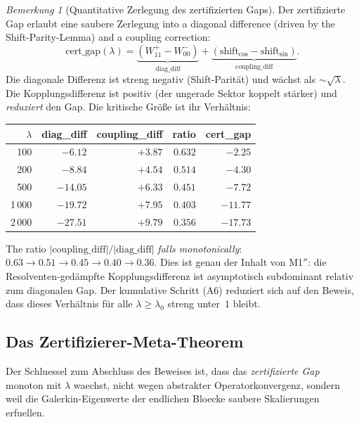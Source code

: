 \documentclass[12pt,a4paper]{article}
\theoremstyle{definition}
\theoremstyle{remark}
\newtheorem{remark}[theorem]{Bemerkung}
\begin{document}
\begin{remark}[Quantitative Zerlegung des zertifizierten Gaps]
\label{rem:gap-decomposition}
Der zertifizierte Gap erlaubt eine saubere Zerlegung into a diagonal difference (driven by the Shift-Parity-Lemma) and a coupling correction:
\[
  \mathrm{cert\_gap}(\lambda) = \underbrace{(W_{11}^+ - W_{00}^-)}_{\text{diag\_diff}} + \underbrace{(\text{shift}_{\cos} - \text{shift}_{\sin})}_{\text{coupling\_diff}}.
\]
Die diagonale Differenz ist streng negativ (Shift-Parität) und wächst als $\sim\!\sqrt{\lambda}$. Die Kopplungsdifferenz ist positiv (der ungerade Sektor koppelt stärker) und \emph{reduziert} den Gap. Die kritische Größe ist ihr Verhältnis:

\begin{center}
\small
\begin{tabular}{r|r|r|r|r}
$\lambda$ & diag\_diff & coupling\_diff & ratio & cert\_gap \\\hline
100 & $-6.12$ & $+3.87$ & $0.632$ & $-2.25$ \\
200 & $-8.84$ & $+4.54$ & $0.514$ & $-4.30$ \\
500 & $-14.05$ & $+6.33$ & $0.451$ & $-7.72$ \\
1\,000 & $-19.72$ & $+7.95$ & $0.403$ & $-11.77$ \\
2\,000 & $-27.51$ & $+9.79$ & $0.356$ & $-17.73$
\end{tabular}
\end{center}

\noindent The ratio $|\text{coupling\_diff}|/|\text{diag\_diff}|$ \emph{falls monotonically}: $0.63 \to 0.51 \to 0.45 \to 0.40 \to 0.36$. Dies ist genau der Inhalt von M1$''$: die Resolventen-gedämpfte Kopplungsdifferenz ist asymptotisch subdominant relativ zum diagonalen Gap. Der kumulative Schritt (A6) reduziert sich auf den Beweis, dass dieses Verhältnis für alle $\lambda \geq \lambda_0$ streng unter~$1$ bleibt.
\end{remark}

\subsection{Das Zertifizierer-Meta-Theorem}
\label{sec:meta-theorem}

Der Schluessel zum Abschluss des Beweises ist, dass das \emph{zertifizierte Gap} monoton mit $\lambda$ waechst, nicht wegen abstrakter Operatorkonvergenz, sondern weil die Galerkin-Eigenwerte der endlichen Bloecke saubere Skalierungen erfuellen.
\end{document}
